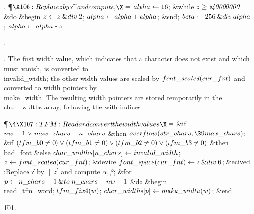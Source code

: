 . \P$\X106:Replace \|z by $\|z^\prime$ and compute $\alpha,\beta$\X\S$\6
$\\{alpha}\K16$;\6
\&{while} $\|z\G\O{40000000}$ \1\&{do}\6
\&{begin} $\|z\K\|z\mathbin{\&{div}}2$;\5
$\\{alpha}\K\\{alpha}+\\{alpha}$;\6
\&{end};\2\6
$\\{beta}\K256\mathbin{\&{div}}\\{alpha}$;\5
$\\{alpha}\K\\{alpha}\ast\|z$\par
{}.\fi

. The first width value, which indicates that a character does not exist
and which must vanish, is converted to \\{invalid\_width}; the other width
values are scaled by $\\{font\_scaled}(\\{cur\_fnt})$ and converted to width
pointers by \\{make\_width}. The resulting width pointers are stored
temporarily in the \\{char\_widths} array, following the with indices.

\Y\P$\4\X107:TFM: Read and convert the width values\X\S$\6
\&{if} $\\{nw}-1>\\{max\_chars}-\\{n\_chars}$ \1\&{then}\5
$\\{overflow}(\\{str\_chars},\39\\{max\_chars})$;\2\6
\&{if} $(\\{tfm\_b0}\I0)\V(\\{tfm\_b1}\I0)\V(\\{tfm\_b2}\I0)\V(\\{tfm\_b3}\I0)$
\1\&{then}\5
\\{bad\_font}\6
\4\&{else} $\\{char\_widths}[\\{n\_chars}]\K\\{invalid\_width}$;\2\6
$\|z\K\\{font\_scaled}(\\{cur\_fnt})$;\6
\&{device} $\\{font\_space}(\\{cur\_fnt})\K\|z\mathbin{\&{div}}6$;\6
\&{ecived}\5
:Replace \|z by $\|z^\prime$ and compute $\alpha,\beta$\X;\6
\&{for} $\|p\K\\{n\_chars}+1\mathrel{\&{to}}\\{n\_chars}+\\{nw}-1$ \1\&{do}\6
\&{begin} \\{read\_tfm\_word};\5
$\\{tfm\_fix4}(\|w)$;\5
$\\{char\_widths}[\|p]\K\\{make\_width}(\|w)$;\6
\&{end}\2\par
\U101.\fi

